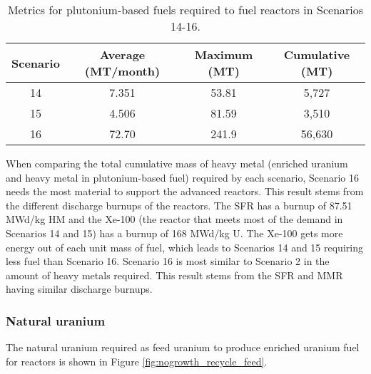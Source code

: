 \begin{table}[h!]
    \centering 
    \caption{Metrics for plutonium-based fuels required to fuel reactors 
    in Scenarios 14-16.}
    \label{tab:s14-16_mox}
    \begin{tabular}{c c c c}
        \hline 
        Scenario & Average (MT/month) & Maximum (MT) & Cumulative (MT) \\
        \hline 
        14 & 7.351 & 53.81 & 5,727 \\
        15 & 4.506 & 81.59 & 3,510 \\
        16 & 72.70 & 241.9 & 56,630 \\
        \hline
        
    \end{tabular}
\end{table}

When comparing the total cumulative mass of heavy metal (enriched 
uranium and heavy metal in plutonium-based fuel) required by each scenario,
Scenario 16 needs the most material to support the advanced reactors. This 
result stems from the different discharge burnups of the reactors. The 
\gls{SFR} has a burnup of 87.51 MWd/kg HM and the Xe-100 (the reactor that 
meets most of the demand in Scenarios 14 and 15) has a burnup of 168 MWd/kg U. 
The Xe-100 gets more energy out of each unit mass of fuel, which leads to 
Scenarios 14 and 15 requiring less fuel than Scenario 16. Scenario 16 is most 
similar to Scenario 2 in the amount of heavy metals required. This result 
stems from the \gls{SFR} and \gls{MMR} having similar discharge burnups.

\subsubsection{Natural uranium}
The natural uranium required as feed uranium to produce enriched 
uranium fuel for reactors is shown in Figure \ref{fig:nogrowth_recycle_feed}.


